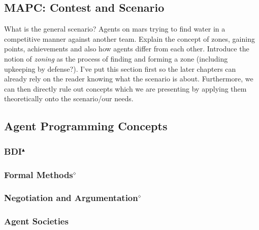 \subsection{MAPC: Contest and Scenario}
What is the general scenario? Agents on mars trying to find water in a competitive manner against another team. Explain the concept of zones, gaining points, achievements and also how agents differ from each other. Introduce the notion of \emph{zoning} as the process of finding and forming a zone (including upkeeping by defense?).
I've put this section first so the later chapters can already rely on the reader knowing what the scenario is about. Furthermore, we can then directly rule out concepts which we are presenting by applying them theoretically onto the scenario/our needs.

\subsection{Agent Programming Concepts}
\subsubsection[BDI]{BDI$^\blacktriangle$}


\subsubsection[Formal Methods]{Formal Methods$^\diamond$}


\subsubsection[Negotiation and Argumentation]{Negotiation and Argumentation$^\diamond$}


\subsubsection{Agent Societies}
